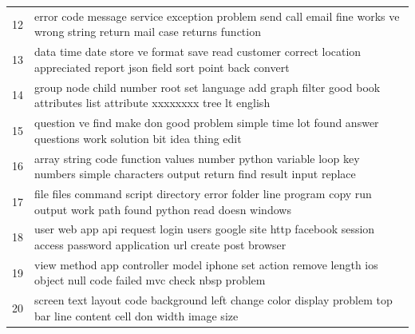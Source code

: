 \documentclass[conference]{IEEEtran}
\begin{document}
\begin{table}[!t]
\begin{tabular}{ll}
12           & error code message service exception problem send call email fine works ve wrong string return mail case returns function                          \\
13           & data time date store ve format save read customer correct location appreciated report json field sort point back convert                           \\
14           & group node child number root set language add graph filter good book attributes list attribute xxxxxxxx tree lt english                            \\
15           & question ve find make don good problem simple time lot found answer questions work solution bit idea thing edit                                    \\
16           & array string code function values number python variable loop key numbers simple characters output return find result input replace                \\
17           & file files command script directory error folder line program copy run output work path found python read doesn windows                            \\
18           & user web app api request login users google site http facebook session access password application url create post browser                         \\
19           & view method app controller model iphone set action remove length ios object null code failed mvc check nbsp problem                                \\
20           & screen text layout code background left change color display problem top bar line content cell don width image size  \\ \hline                             
\end{tabular}
\end{table}
%
%
\end{document}

